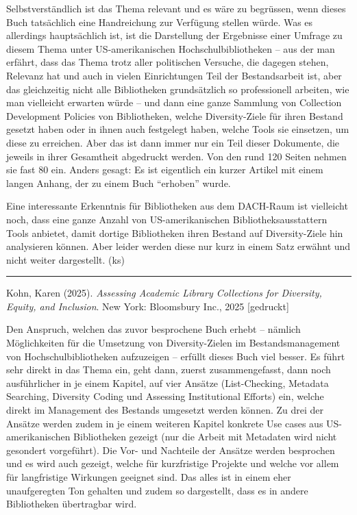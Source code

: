 \documentclass[a4paper,
fontsize=11pt,
oneside,
numbers=noperiodatend,
parskip=half-,
bibliography=totoc,
final
]{scrartcl}
\begin{document}
Selbstverständlich ist das Thema relevant und es wäre zu begrüssen, wenn
dieses Buch tatsächlich eine Handreichung zur Verfügung stellen würde.
Was es allerdings hauptsächlich ist, ist die Darstellung der Ergebnisse
einer Umfrage zu diesem Thema unter US-amerikanischen
Hochschulbibliotheken -- aus der man erfährt, dass das Thema trotz aller
politischen Versuche, die dagegen stehen, Relevanz hat und auch in
vielen Einrichtungen Teil der Bestandsarbeit ist, aber das gleichzeitig
nicht alle Bibliotheken grundsätzlich so professionell arbeiten, wie man
vielleicht erwarten würde -- und dann eine ganze Sammlung von Collection
Development Policies von Bibliotheken, welche Diversity-Ziele für ihren
Bestand gesetzt haben oder in ihnen auch festgelegt haben, welche Tools
sie einsetzen, um diese zu erreichen. Aber das ist dann immer nur ein
Teil dieser Dokumente, die jeweils in ihrer Gesamtheit abgedruckt
werden. Von den rund 120 Seiten nehmen sie fast 80 ein. Anders gesagt:
Es ist eigentlich ein kurzer Artikel mit einem langen Anhang, der zu
einem Buch \enquote{erhoben} wurde.

Eine interessante Erkenntnis für Bibliotheken aus dem DACH-Raum ist
vielleicht noch, dass eine ganze Anzahl von US-amerikanischen
Bibliotheksausstattern Tools anbietet, damit dortige Bibliotheken ihren
Bestand auf Diversity-Ziele hin analysieren können. Aber leider werden
diese nur kurz in einem Satz erwähnt und nicht weiter dargestellt. (ks)

\begin{center}\rule{0.5\linewidth}{0.5pt}\end{center}

Kohn, Karen (2025). \emph{Assessing Academic Library Collections for
Diversity, Equity, and Inclusion}. New York: Bloomsbury Inc., 2025
{[}gedruckt{]}

Den Anspruch, welchen das zuvor besprochene Buch erhebt -- nämlich
Möglichkeiten für die Umsetzung von Diversity-Zielen im
Bestandsmanagement von Hochschulbibliotheken aufzuzeigen -- erfüllt
dieses Buch viel besser. Es führt sehr direkt in das Thema ein, geht
dann, zuerst zusammengefasst, dann noch ausführlicher in je einem
Kapitel, auf vier Ansätze (List-Checking, Metadata Searching, Diversity
Coding und Assessing Institutional Efforts) ein, welche direkt im
Management des Bestands umgesetzt werden können. Zu drei der Ansätze
werden zudem in je einem weiteren Kapitel konkrete Use cases aus
US-amerikanischen Bibliotheken gezeigt (nur die Arbeit mit Metadaten
wird nicht gesondert vorgeführt). Die Vor- und Nachteile der Ansätze
werden besprochen und es wird auch gezeigt, welche für kurzfristige
Projekte und welche vor allem für langfristige Wirkungen geeignet sind.
Das alles ist in einem eher unaufgeregten Ton gehalten und zudem so
dargestellt, dass es in andere Bibliotheken übertragbar wird.
\end{document}
